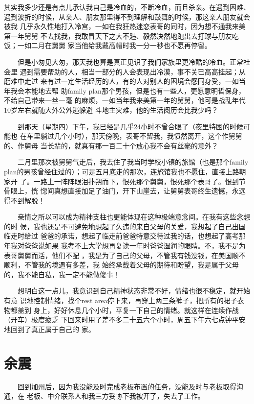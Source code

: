 \documentclass[12pt]{book}
\begin{document}
    其实我多少还是有点儿承认我自己是冷血的，不断冷血，而且杀亲。在遇到困难、
遇到波折的时候，从亲人、朋友那里得不到理解和鼓舞的时候，那这亲人朋友就会被我
几乎永久性地打入冷宫，一如在我狂热迷恋表哥的同时，因为想不通我来美第一年舅舅
不去找我，我敢冒天下之大不韪、毅然决然地跑出去打球与朋友吃饭；一如二月在舅舅
家当他给我戴高帽时我一分一秒也不愿再停留。

　　但是小匆见大匆，那天我也算是真正见识了我们家族里更冷酷的冷血。正常社会里
遇到需要帮助的人，相当一部分的人会表现出冷漠，事不关已高高挂起；从磨难中走过
来有过一定生活经历的人，有的人对别人的困境会感同身受，一如当年我会本能地去帮
助family plan那个男孩，但是也有一些人，更愿意明哲保身，不给自己带来一丝一毫
的麻烦，一如当年我来美第一年的舅舅，他可是战乱年代10岁左右就随大外公外逃躲避
斗地主灾难，他的生活阅历会比我少吗？

　　到那天（星期四）下午，我已经是几乎24小时不曾合眼了（夜里特困的时候可能也
在车里躺过几个小时），那天傍晚，表哥不留我，我愤然离开，这个作舅舅的、作舅母
当长辈的，就真有那一百二十个放心我不会有丝毫的意外？

　　二月里那次被舅舅气走后，我去住了我当时学校小镇的旅馆（也是那个family 
plan的男孩曾经住过的）；可是五月底走的那次，连旅馆我也不愿住，直接上路朝家开
了。一路上一阵阵眼泪扑朔而下，恨死那个舅舅，恨死那个表哥了。恨到节骨眼上，恍
惚间真想直接加足了油门，开下山崖去，让舅舅表哥终生遗憾，永远得不到解脱！

　　亲情之所以可以成为精神支柱也更能体现在这种极端意念间。在我有这些念想的时
候，我也还是不可避免地想起了久违的来自父母的关爱，我想起了自己出国临走时给过
爸爸的承诺，想起了临走前爸爸特意交待过我的话，也想起了高考那年我对爸爸说如果
我考不上大学想再复读一年时爸爸湿润的眼睛。不，我不是为表哥舅舅而活，他们不配
，我是为了自己的父母，不管我有钱没钱，在美国顺不顺利，不管我的境遇有多差，我
始终承载着父母的期待和盼望，我是属于父母的，我不能自私，我一定不能做傻事！

　　想明白这一点儿，我意识到自己精神状态非常不好，情绪也很不稳定，就开始有意
识地控制情绪，找个rest area停下来，再穿上两三条裤子，把所有的裙子衣物都盖到
身上，好好休息几个小时，平复一下自己的情绪。就这样在连续作战（开车）极度疲乏
下回来时用了差不多二十五六个小时，周五下午六七点钟平安地回到了真正属于自己的
家。
\section{余震}
\label{sec-8-19}

　　回到加州后，因为我没能及时完成老板布置的任务，没能及时与老板取得沟通，在
老板、中介联系人和我三方妥协下我被开了，失去了工作。
\end{document}
